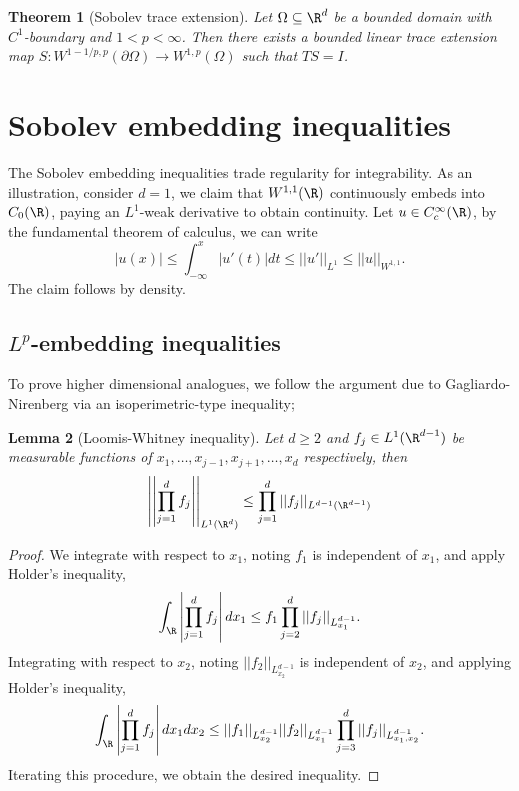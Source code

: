 \documentclass[reqno]{amsart}
\newtheorem{theorem}{Theorem}
\newtheorem{lemma}[theorem]{Lemma}
\theoremstyle{definition}
\theoremstyle{remark}
\begin{document}
\begin{theorem}[Sobolev trace extension]
	Let $\Omega \subseteq \R^d$ be a bounded domain with $C^1$-boundary and $1 < p < \infty$. Then there exists a bounded linear trace extension map $S: W^{1 - 1/p, p} (\partial\Omega) \to W^{1,p} (\Omega)$ such that $TS = I$. 
\end{theorem}

\section{Sobolev embedding inequalities}

The Sobolev embedding inequalities trade regularity for integrability. As an illustration, consider $d = 1$, we claim that $W^{1, 1} (\R)$ continuously embeds into $C_0 (\R)$, paying an $L^1$-weak derivative to obtain continuity. Let $u \in C^\infty_c (\R)$, by the fundamental theorem of calculus, we can write
	\[ |u(x)| \leq \int_{-\infty}^x |u' (t)| dt \leq ||u'||_{L^1} \leq ||u||_{W^{1, 1}}. \]
The claim follows by density. 

\subsection{$L^p$-embedding inequalities}

To prove higher dimensional analogues, we follow the argument due to Gagliardo-Nirenberg via an isoperimetric-type inequality;
	

\begin{lemma}[Loomis-Whitney inequality]
	Let $d \geq 2$ and $f_j \in L^1 (\R^{d - 1})$ be measurable functions of $x_1, \dots, x_{j - 1}, x_{j + 1}, \dots, x_d$ respectively, then 
		\[ \left|\left| \prod_{j = 1}^d f_j \right|\right|_{L^1 (\R^d)} \leq \prod_{j = 1}^d ||f_j||_{L^{d - 1} (\R^{d - 1})} \]
\end{lemma}

\begin{proof}
	We integrate with respect to $x_1$, noting $f_1$ is independent of $x_1$, and apply Holder's inequality,
		\[ \int_{\R} \left|\prod_{j  =1 }^d f_j\right| dx_1 \leq f_1 \prod_{j = 2}^d ||f_j||_{L^{d - 1}_{x_1}}. \]
	Integrating with respect to $x_2$, noting $||f_2||_{L^{d - 1}_{x_2}}$ is independent of $x_2$, and applying Holder's inequality, 
		\[ \int_{\R} \left|\prod_{j  =1 }^d f_j \right| dx_1 dx_2 \leq ||f_1||_{L^{d - 1}_{x_2}} ||f_2||_{L^{d - 1}_{x_1}} \prod_{j = 3}^d ||f_j||_{L^{d - 1}_{x_1, x_2}} .\]
	Iterating this procedure, we obtain the desired inequality. 
\end{proof}
\end{document}
